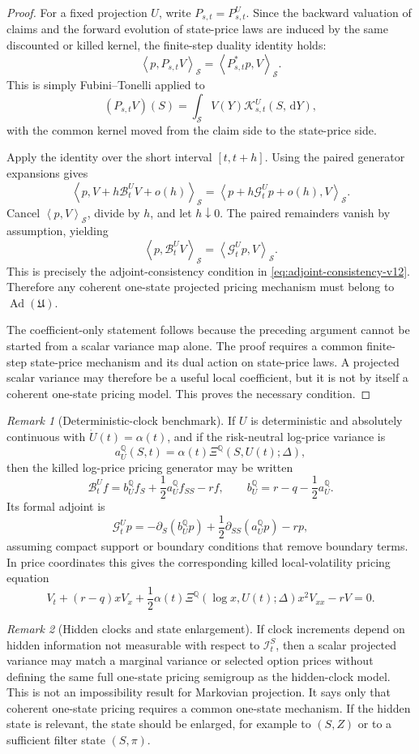 \documentclass[11pt]{amsart}
\newcommand{\Q}{\mathbb{Q}}
\newcommand{\dd}{\,\mathrm{d}}
\newcommand{\Xiop}{\Xi}
\newcommand{\Ad}{\operatorname{Ad}}
\newcommand{\Bop}{\mathcal{B}}
\newcommand{\Gop}{\mathcal{G}}
\newcommand{\Kern}{\mathcal{K}}
\newcommand{\Sdom}{\mathcal S}
\newcommand{\Ical}{\mathcal{I}}
\newcommand{\PairS}[2]{\left\langle #1,#2\right\rangle_{\Sdom}}
\theoremstyle{definition}
\theoremstyle{plain}
\theoremstyle{remark}
\newtheorem{remark}{Remark}
\begin{document}
\begin{proof}
For a fixed projection $U$, write $P_{s,t}=P^U_{s,t}$.  Since the backward valuation of claims and the forward evolution of state-price laws are induced by the same discounted or killed kernel, the finite-step duality identity holds:
\[
 \PairS{p}{P_{s,t}V}=\PairS{P_{s,t}^*p}{V}.
\]
This is simply Fubini--Tonelli applied to
\[
 (P_{s,t}V)(S)=\int_{\Sdom}V(Y)\Kern^U_{s,t}(S,\dd Y),
\]
with the common kernel moved from the claim side to the state-price side.

Apply the identity over the short interval $[t,t+h]$.  Using the paired generator expansions gives
\[
 \PairS{p}{V+h\Bop^U_tV+o(h)}
 =
 \PairS{p+h\Gop^U_tp+o(h)}{V}.
\]
Cancel $\PairS{p}{V}$, divide by $h$, and let $h\downarrow0$.  The paired remainders vanish by assumption, yielding
\[
 \PairS{p}{\Bop^U_tV}=\PairS{\Gop^U_tp}{V}.
\]
This is precisely the adjoint-consistency condition in \eqref{eq:adjoint-consistency-v12}.  Therefore any coherent one-state projected pricing mechanism must belong to $\Ad(\mathfrak U)$.

The coefficient-only statement follows because the preceding argument cannot be started from a scalar variance map alone.  The proof requires a common finite-step state-price mechanism and its dual action on state-price laws.  A projected scalar variance may therefore be a useful local coefficient, but it is not by itself a coherent one-state pricing model.  This proves the necessary condition.
\end{proof}

\begin{remark}[Deterministic-clock benchmark]
If $U$ is deterministic and absolutely continuous with $\dot U(t)=\alpha(t)$, and if the risk-neutral log-price variance is
\[
 a_U^\Q(S,t)=\alpha(t)\Xiop^\Q(S,U(t);\Delta),
\]
then the killed log-price pricing generator may be written
\[
 \Bop^U_t f=b_U^\Q f_S+\frac12a_U^\Q f_{SS}-rf,
 \qquad
 b_U^\Q=r-q-\frac12a_U^\Q.
\]
Its formal adjoint is
\[
 \Gop^U_t p=-\partial_S(b_U^\Q p)+\frac12\partial_{SS}(a_U^\Q p)-rp,
\]
assuming compact support or boundary conditions that remove boundary terms.  In price coordinates this gives the corresponding killed local-volatility pricing equation
\[
 V_t+(r-q)xV_x+\frac12\alpha(t)\Xiop^\Q(\log x,U(t);\Delta)x^2V_{xx}-rV=0.
\]
\end{remark}

\begin{remark}[Hidden clocks and state enlargement]
If clock increments depend on hidden information not measurable with respect to $\Ical_t^S$, then a scalar projected variance may match a marginal variance or selected option prices without defining the same full one-state pricing semigroup as the hidden-clock model.  This is not an impossibility result for Markovian projection.  It says only that coherent one-state pricing requires a common one-state mechanism.  If the hidden state is relevant, the state should be enlarged, for example to $(S,Z)$ or to a sufficient filter state $(S,\pi)$.
\end{remark}
\end{document}
